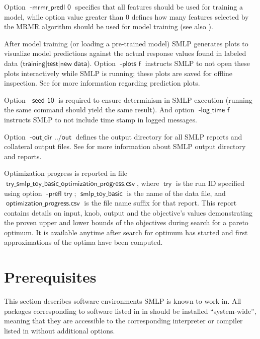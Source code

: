 \documentclass[a4paper,parskip=half]{article} %
\newcommand*\option[1]{\operatorname{\mathsf{#1}}} %
\newcommand*\optionval[2]{\operatorname{\mathsf{#1}\,\,\mathsf{#2}}} %
\newcommand*\suffix[1]{\operatorname{\mathsf{#1}}} %
\newcommand*\SolverAbbrvText{SMLP}
\newcommand*\SolverAbbrv{\SolverAbbrvText\xspace}
\begin{document}
Option $\optionval{-mrmr\_predl}{0}$ specifies that all features should be used for training a model, while option
value greater than $0$ defines how many features selected by the MRMR algorithm should be used for model training 
(see also ).

After model training (or loading a pre-trained model) SMLP generates plots to visualize model predictions 
against the actual response values found in labeled data ($\option{training|test|new\,\,data}$). 
 Option $\optionval{-plots}{f}$ instructs SMLP to not open these plots interactively while SMLP is running;
these plots are saved for offline inspection. See  for more information regarding prediction plots.

Option $\optionval{-seed}{10}$ is required to ensure determinism in SMLP execution (running the same command 
should yield the same result). And option $\optionval{-log\_time}{f}$ instructs SMLP to not include time stamp in
logged messages.

Option $\optionval{-out\_dir}{../out}$ defines the output directory for all SMLP reports and collateral output files.
See  for more information about SMLP output directory and reports. 

Optimization progress is reported in file $\suffix{try\_smlp\_toy\_basic\_optimization\_progress.csv}$, 
where $\option{try}$ is the run ID specified using option $\optionval{-prefl}{try}$; $\suffix{smlp\_toy\_basic}$ 
is the name of the data file, and $\suffix{optimization\_progress.csv}$ is the file name suffix for that report. 
This report contains details on input, knob, output and the objective's values demonstrating the proven 
upper and lower bounds of the objectives during search for a pareto optimum. It is available anytime
after search for optimum has started and first approximations of the optima have been computed.






\section{Prerequisites}
This section describes software environments \SolverAbbrv is known to work in.
All packages corresponding to software listed in in  should be
installed ``system-wide'',
meaning that they are accessible to the corresponding interpreter or compiler
listed in  without additional options.
\end{document}
